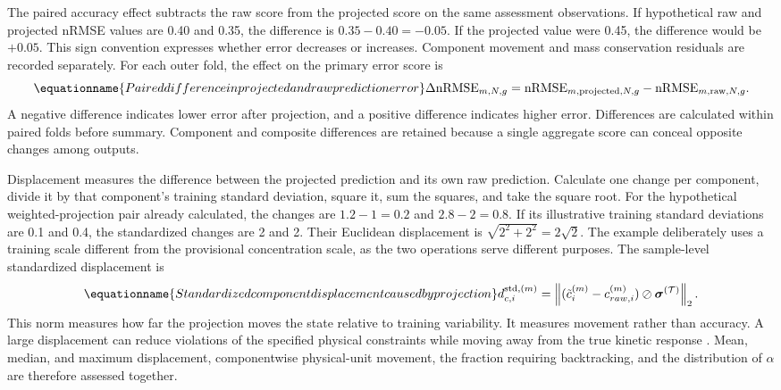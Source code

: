 The paired accuracy effect subtracts the raw score from the projected score on the same assessment observations. If hypothetical raw and projected nRMSE values are 0.40 and 0.35, the difference is $0.35-0.40=-0.05$. If the projected value were 0.45, the difference would be $+0.05$. This sign convention expresses whether error decreases or increases. Component movement and mass conservation residuals are recorded separately. For each outer fold, the effect on the primary error score is
\begin{equation}
\equationname{Paired difference in projected and raw prediction error}
\Delta\mathrm{nRMSE}_{m,N,g}=
\mathrm{nRMSE}_{m,\mathrm{projected},N,g}
-\mathrm{nRMSE}_{m,\mathrm{raw},N,g}.
\label{eq:projection_paired_error_difference}
\end{equation}
A negative difference indicates lower error after projection, and a positive difference indicates higher error. Differences are calculated within paired folds before summary. Component and composite differences are retained because a single aggregate score can conceal opposite changes among outputs.

Displacement measures the difference between the projected prediction and its own raw prediction. Calculate one change per component, divide it by that component's training standard deviation, square it, sum the squares, and take the square root. For the hypothetical weighted-projection pair already calculated, the changes are $1.2-1=0.2$ and $2.8-2=0.8$. If its illustrative training standard deviations are 0.1 and 0.4, the standardized changes are 2 and 2. Their Euclidean displacement is $\sqrt{2^2+2^2}=2\sqrt2$. The example deliberately uses a training scale different from the provisional concentration scale, as the two operations serve different purposes. The sample-level standardized displacement is
\begin{equation}
\equationname{Standardized component displacement caused by projection}
d_{c,i}^{\mathrm{std},(m)}=
\left\|(\tilde c_i^{(m)}-c_{raw,i}^{(m)})
\oslash\boldsymbol{\sigma}^{(\mathcal{T})}\right\|_2.
\label{eq:projection_standardized_displacement}
\end{equation}
This norm measures how far the projection moves the state relative to training variability. It measures movement rather than accuracy. A large displacement can reduce violations of the specified physical constraints while moving away from the true kinetic response \citep{SturmSilva2024,KircherVotsmeier2025}. Mean, median, and maximum displacement, componentwise physical-unit movement, the fraction requiring backtracking, and the distribution of $\alpha$ are therefore assessed together.

